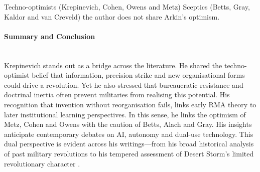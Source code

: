 Techno-optimists (Krepinevich, Cohen, Owens and Metz)
Sceptics (Betts, Gray, Kaldor and van Creveld)
the author does not share Arkin's optimism. 


\paragraph{Summary and Conclusion}\mbox{}\\
Krepinevich stands out as a bridge across the literature. He shared the techno-optimist belief that information, precision strike and new organisational forms could drive a revolution. Yet he also stressed that bureaucratic resistance and doctrinal inertia often prevent militaries from realising this potential. His recognition that invention without reorganisation fails, links early RMA theory to later institutional learning perspectives. In this sense, he links the optimism of Metz, Cohen and Owens with the caution of Betts, Alach and Gray. His insights anticipate contemporary debates on AI, autonomy and dual-use technology. This dual perspective is evident across his writings—from his broad historical analysis of past military revolutions \parencite{KREPINEVICH_1994} to his tempered assessment of Desert Storm’s limited revolutionary character \parencite{KREPINEVICH_1996}.







